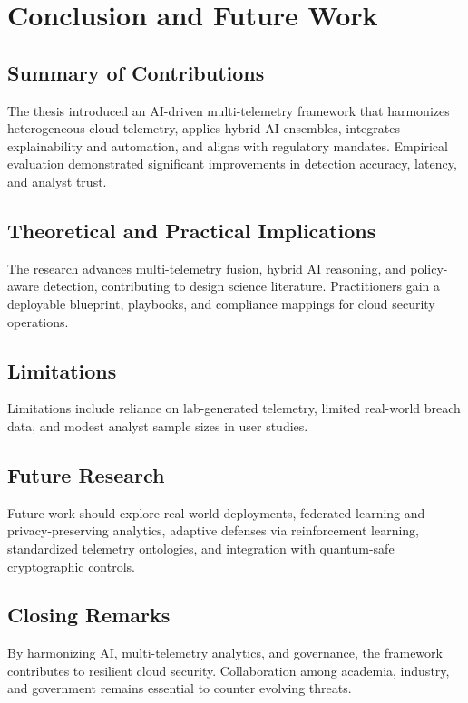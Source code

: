 \chapter{Conclusion and Future Work}\label{chap:conclusion}
\section{Summary of Contributions}
The thesis introduced an AI-driven multi-telemetry framework that harmonizes heterogeneous cloud telemetry, applies hybrid AI ensembles, integrates explainability and automation, and aligns with regulatory mandates. Empirical evaluation demonstrated significant improvements in detection accuracy, latency, and analyst trust.

\section{Theoretical and Practical Implications}
The research advances multi-telemetry fusion, hybrid AI reasoning, and policy-aware detection, contributing to design science literature. Practitioners gain a deployable blueprint, playbooks, and compliance mappings for cloud security operations.

\section{Limitations}
Limitations include reliance on lab-generated telemetry, limited real-world breach data, and modest analyst sample sizes in user studies.

\section{Future Research}
Future work should explore real-world deployments, federated learning and privacy-preserving analytics, adaptive defenses via reinforcement learning, standardized telemetry ontologies, and integration with quantum-safe cryptographic controls.

\section{Closing Remarks}
By harmonizing AI, multi-telemetry analytics, and governance, the framework contributes to resilient cloud security. Collaboration among academia, industry, and government remains essential to counter evolving threats.
